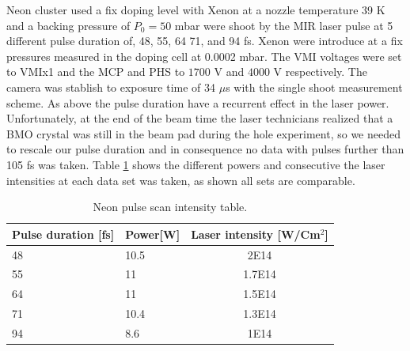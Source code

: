 Neon cluster used a fix doping level with Xenon at a nozzle temperature 39 K and a backing pressure of $P_{0}=50$ mbar were shoot by the MIR laser pulse at 5 different pulse duration of, 48, 55, 64 71, and 94 fs. Xenon were introduce at a fix pressures measured in the doping cell at 0.0002 mbar. The VMI voltages were set to VMIx1 and the MCP and PHS to $1700$ V and $4000$ V respectively. The camera was stablish to exposure time of 34 $\mu$s with the single shoot measurement scheme. As above the pulse duration have a recurrent effect in the laser power. Unfortunately, at the end of the beam time the laser technicians realized that a BMO crystal was still in the beam pad during the hole experiment, so we needed to rescale our pulse duration and in consequence no data with pulses further than 105 fs was taken. Table \ref{tab:Neonpulsepower} shows the different powers and consecutive the laser intensities at each data set was taken, as shown all sets are comparable.

\begin{table}[t]
\centering

\begin{tabular}{|l|l|c|}
\hline
Pulse duration {[}fs{]} & \multicolumn{1}{c|}{Power{[}W{]}} & Laser intensity {[}W/Cm$^{2}${]} \\ \hline
48 & 10.5 & 2E14 \\ \hline
55 & 11 & 1.7E14 \\ \hline
64 & 11 & 1.5E14 \\ \hline
71 & 10.4 & 1.3E14 \\ \hline
94 & 8.6 & 1E14 \\ \hline
\end{tabular}
\caption{Neon pulse scan  intensity table.}
\label{tab:Neonpulsepower}
\end{table}

